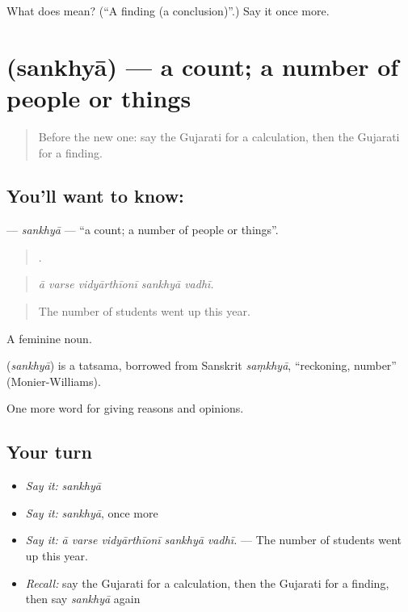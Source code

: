 \begin{tcolorbox}[breakable,colback=teal!4,colframe=teal!35!black,title={Before you move on}]
What does  mean? (\textquotedblleft{}A finding (a conclusion)\textquotedblright{}.) Say it once more.
\end{tcolorbox}
\section[\texorpdfstring{\gu{સંખ્યા} (sankhyā)}{સંખ્યા (sankhyā)}]{ (sankhyā) — a count; a number of people or things}

\label{lesson:GU-C363-sankhya}



\begin{quote}
Before the new one: say the Gujarati for a calculation, then the Gujarati for a finding.
\end{quote}

\subsection*{You'll want to know: }
\textbf{} — \emph{sankhyā} — \textquotedblleft{}a count; a number of people or things\textquotedblright{}.

\begin{quote}
    .
\end{quote}

\begin{quote}
\emph{ā varse vidyārthīonī sankhyā vadhī.}
\end{quote}

\begin{quote}
The number of students went up this year.
\end{quote}

A feminine noun.

\begin{cousinweb}
\textbf{} (\emph{sankhyā}) is a tatsama, borrowed from Sanskrit \emph{saṃkhyā}, \textquotedblleft{}reckoning, number\textquotedblright{} (Monier-Williams).
\end{cousinweb}

\begin{grammarlens}[title={What you've built}]
One more word for giving reasons and opinions.
\end{grammarlens}

\subsection*{Your turn}
\begin{itemize}
\raggedright
  \item \emph{Say it:} \emph{sankhyā}
  \item \emph{Say it:} \emph{sankhyā}, once more
  \item \emph{Say it:} \emph{ā varse vidyārthīonī sankhyā vadhī.} — The number of students went up this year.
  \item \emph{Recall:} say the Gujarati for a calculation, then the Gujarati for a finding, then say \emph{sankhyā} again
\end{itemize}

